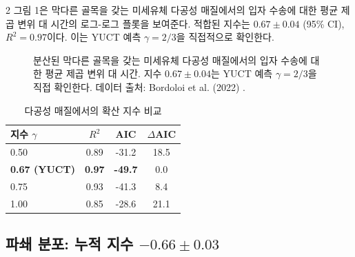 \documentclass[11pt,a4paper]{article}
\begin{document}
\begin{multicols}{2}
		그림 1은 막다른 골목을 갖는 미세유체 다공성 매질에서의 입자 수송에 대한 평균 제곱 변위 대 시간의 로그-로그 플롯을 보여준다. 적합된 지수는 \(0.67 \pm 0.04\) (95\% CI), \(R^2 = 0.97\)이다. 이는 YUCT 예측 \(\gamma = 2/3\)을 직접적으로 확인한다.
		
		\begin{figure}[htbp]
			\centering
			\caption{분산된 막다른 골목을 갖는 미세유체 다공성 매질에서의 입자 수송에 대한 평균 제곱 변위 대 시간. 지수 \(0.67 \pm 0.04\)는 YUCT 예측 \(\gamma = 2/3\)을 직접 확인한다. 데이터 출처: Bordoloi et al. (2022) \cite{Bordoloi2022}.}
			\label{fig:diffusion}
		\end{figure}
		
		\begin{table}[htbp]
			\centering
			\caption{다공성 매질에서의 확산 지수 비교}
			\label{tab:diffusion}
			\begin{tabular}{lccc}
				\toprule
				지수 \(\gamma\) & \(R^2\) & AIC & \(\Delta\)AIC \\
				\midrule
				0.50 & 0.89 & -31.2 & 18.5 \\
				\textbf{0.67 (YUCT)} & \textbf{0.97} & \textbf{-49.7} & 0.0 \\
				0.75 & 0.93 & -41.3 & 8.4 \\
				1.00 & 0.85 & -28.6 & 21.1 \\
				\bottomrule
			\end{tabular}
		\end{table}
		
		\subsection{파쇄 분포: 누적 지수 \(-0.66 \pm 0.03\)}
		

\end{multicols}
\end{document}
